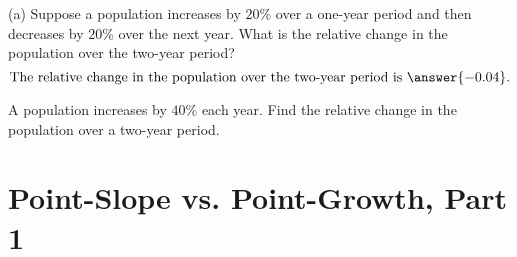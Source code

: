 \documentclass{ximera}
\begin{document}
\begin{question}  \label{Q2:ExponentialG}
(a) Suppose a population increases by $20\%$ over a one-year period and then decreases by $20\%$ over the next year. What is the relative change in the population over the two-year period?
\[
   \text{The relative change in the population over the two-year period is }   \answer{-0.04} .
\]

\end{question}

\begin{question}  \label{Q3:ExponentialG}
A population increases by $40\%$ each year. Find the relative change in the population over a two-year period. 
\begin{multipleChoice}  
\end{multipleChoice}  
\end{question}




\section{Point-Slope vs. Point-Growth, Part 1}
\end{document}
